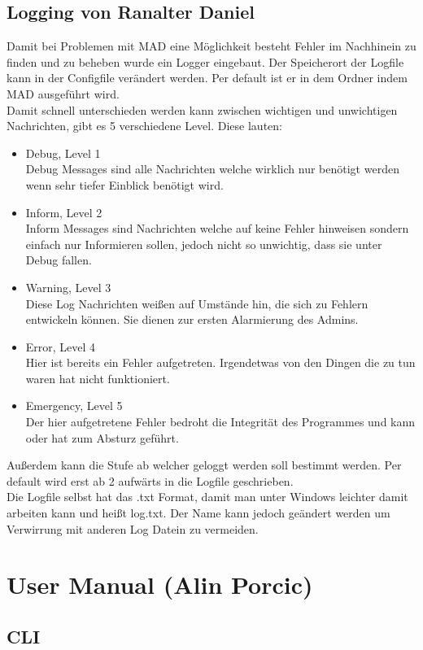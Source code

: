 \documentclass[12pt,a4paper]{report}
\begin{document}
\chapter{Logging von Ranalter Daniel}
Damit bei Problemen mit MAD eine Möglichkeit besteht Fehler im Nachhinein zu finden und zu beheben wurde ein Logger eingebaut. Der Speicherort der Logfile kann in der Configfile verändert werden. Per default ist er in dem Ordner indem MAD ausgeführt wird.\\
Damit schnell unterschieden werden kann zwischen wichtigen und unwichtigen Nachrichten, gibt es 5 verschiedene \glqq Level\grqq . Diese lauten:
\begin{itemize}
\item Debug, Level 1\\
Debug Messages sind alle Nachrichten welche wirklich nur benötigt werden wenn sehr tiefer Einblick benötigt wird. 
\item Inform, Level 2\\
Inform Messages sind Nachrichten welche auf keine Fehler hinweisen sondern einfach nur Informieren sollen, jedoch nicht so unwichtig, dass sie unter Debug fallen.
\item Warning, Level 3\\
Diese Log Nachrichten weißen auf Umstände hin, die sich zu Fehlern entwickeln können. Sie dienen zur ersten Alarmierung des Admins.
\item Error, Level 4\\
Hier ist bereits ein Fehler aufgetreten. Irgendetwas von den Dingen die zu tun waren hat nicht funktioniert. 
\item Emergency, Level 5\\
Der hier aufgetretene Fehler bedroht die Integrität des Programmes und kann oder hat zum Absturz geführt. 
\end{itemize}
Außerdem kann die Stufe ab welcher geloggt werden soll bestimmt werden. Per default wird erst ab 2 aufwärts in die Logfile geschrieben.\\

Die Logfile selbst hat das .txt Format, damit man unter Windows leichter damit arbeiten kann und heißt log.txt. Der Name kann jedoch geändert werden um Verwirrung mit anderen Log Datein zu vermeiden. 

\part{User Manual (Alin Porcic)}
\chapter{CLI}
\end{document}
